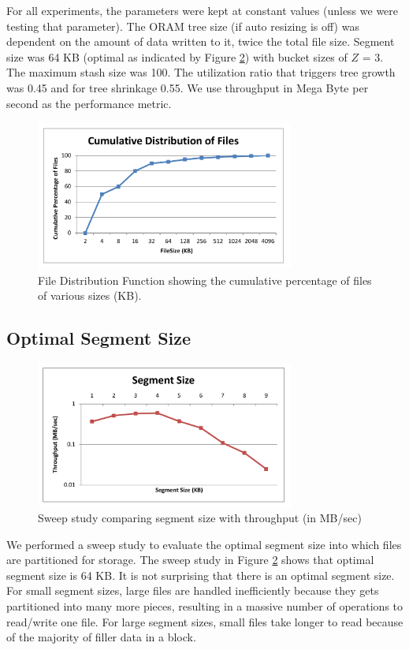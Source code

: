 \documentclass[conference]{IEEEtran}
\begin{document}
For all experiments, the parameters were kept at constant values (unless we were testing that parameter). The ORAM tree size (if auto resizing is off) was dependent on the amount of data written to it, twice the total file size. Segment size was 64 KB (optimal as indicated by Figure \ref{fig:segsize}) with bucket sizes of $Z$ = 3.  The maximum stash size was 100. The utilization ratio that triggers tree growth was 0.45 and for tree shrinkage 0.55. We use throughput in Mega Byte per second as the performance metric.
\begin{figure}
\begin{center}
\noindent\includegraphics[width=8.5cm]{510.pdf}
\caption{File Distribution Function showing the cumulative percentage of files of various sizes (KB).}
\label{fig:distfun}
\end{center}
\end{figure}

\subsection{Optimal Segment Size}
\begin{figure}
\begin{center}
\noindent\includegraphics[width=8.5cm]{520.pdf}
\caption{Sweep study comparing segment size with throughput (in MB/sec)}
\label{fig:segsize}
\end{center}
\end{figure}

We performed a sweep study to evaluate the optimal segment size into which files are partitioned for storage. The sweep study in Figure \ref{fig:segsize} shows that optimal segment size is 64 KB. It is not surprising that there is an optimal segment size. For small segment sizes, large files are handled inefficiently because they gets partitioned into many more pieces, resulting in a massive number of operations to read/write one file. For large segment sizes, small files take longer to read because of the majority of filler data in a block.
\end{document}
